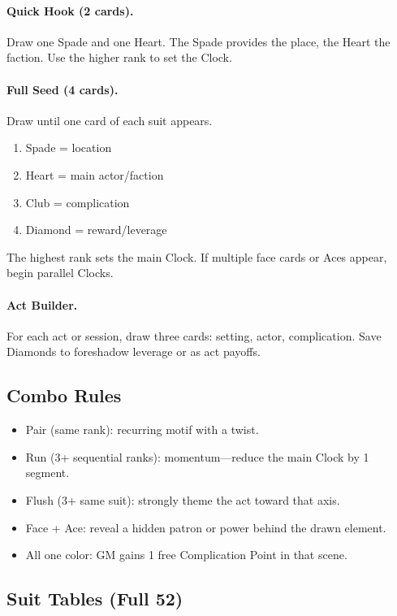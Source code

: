 \documentclass[12pt]{article}
\begin{document}
\paragraph{Quick Hook (2 cards).} Draw one Spade and one Heart. The Spade provides the place, the Heart the faction. Use the higher rank to set the Clock.

\paragraph{Full Seed (4 cards).} Draw until one card of each suit appears.
\begin{enumerate}
  \item Spade = location
  \item Heart = main actor/faction
  \item Club = complication
  \item Diamond = reward/leverage
\end{enumerate}
The highest rank sets the main Clock. If multiple face cards or Aces appear, begin parallel Clocks.

\paragraph{Act Builder.} For each act or session, draw three cards: setting, actor, complication. Save Diamonds to foreshadow leverage or as act payoffs.

\subsection{Combo Rules}
\begin{itemize}
  \item Pair (same rank): recurring motif with a twist.
  \item Run (3+ sequential ranks): momentum—reduce the main Clock by 1 segment.
  \item Flush (3+ same suit): strongly theme the act toward that axis.
  \item Face + Ace: reveal a hidden patron or power behind the drawn element.
  \item All one color: GM gains 1 free Complication Point in that scene.
\end{itemize}

\subsection{Suit Tables (Full 52)}
\end{document}
